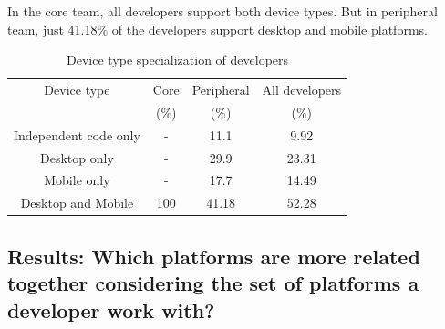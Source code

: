 \documentclass[10pt, conference]{IEEEtran}
\begin{document}
In the core team, all developers support both device types. But in peripheral team, just 41.18\% of the developers support desktop and mobile platforms.       


\begin{table}[h]
\renewcommand{\arraystretch}{1.3}
\caption{Device type specialization of developers}
\label{devicetype}
\centering
\begin{tabular}{|c|c|c|c|}
\hline
 Device type & Core   & Peripheral &All developers \\
  &  (\%)   &  (\%) &  (\%)\\
\hline
Independent code only &     - &     11.1  &   9.92\\
\hline
Desktop only &          - &     29.9  &   23.31\\
\hline
Mobile only &           - &     17.7  &   14.49\\
\hline
Desktop and Mobile &      100 &     41.18 &   52.28 \\
\hline

\end{tabular}
\end{table} 




\subsection{Results: Which platforms are more related together considering the set of platforms a developer work with? }


\end{document}
